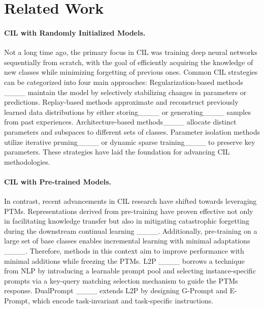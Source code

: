 \section{Related Work}

\paragraph{CIL with Randomly Initialized Models.}
Not a long time ago, the primary focus in CIL was training deep neural networks sequentially from scratch, with the goal of efficiently acquiring the knowledge of new classes while minimizing forgetting of previous ones. Common CIL strategies can be categorized into four main approaches: Regularization-based methods ____ maintain the model by selectively stabilizing changes in parameters or predictions.
Replay-based methods approximate and reconstruct previously learned data distributions by either storing____ or generating____ samples from past experiences.
Architecture-based methods____ allocate distinct parameters and subspaces to different sets of classes. 
Parameter isolation methods utilize iterative pruning____ or dynamic sparse training____ to preserve key parameters.
These strategies have laid the foundation for advancing CIL methodologies.
\paragraph{CIL with Pre-trained Models.}
In contrast, recent advancements in CIL research have shifted towards leveraging PTMs. Representations derived from pre-training have proven effective not only in facilitating knowledge transfer but also in mitigating catastrophic forgetting during the downstream continual learning ____. Additionally, pre-training on a large set of base classes enables incremental learning with minimal adaptations ____. Therefore, methods in this context aim to improve performance with minimal additions while freezing the PTMs.
L2P ____ borrows a technique from NLP by introducing a learnable prompt pool and selecting instance-specific prompts via a key-query matching selection mechanism to guide the PTMs response. 
DualPrompt ____ extends L2P by designing G-Prompt and E-Prompt, which encode task-invariant and task-specific instructions. 


